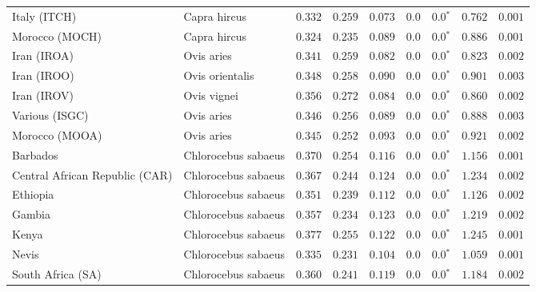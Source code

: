 \begin{center}
\begin{adjustbox}{width = 1\textwidth}
\begin{tabular}{|l|l|r|r|r|r|r|r|r|}
            Italy (ITCH)                    & Capra hircus          & $ 0.332$ & $ 0.259$ & $ 0.073$ & $0.0$ & $\bm{0.0{^*}}$ & $ 0.762$ & $ 0.001$  \\
            Morocco (MOCH)                    & Capra hircus     & $ 0.324$ & $ 0.235$ & $ 0.089$ & $0.0$ & $\bm{0.0{^*}}$ & $ 0.886$ & $ 0.001$ \\
            Iran (IROA)                    & Ovis aries         & $ 0.341$ & $ 0.259$ & $ 0.082$ & $0.0$ & $\bm{0.0{^*}}$ & $ 0.823$ & $ 0.002$ \\
            Iran (IROO)                 & Ovis orientalis          & $ 0.348$ & $ 0.258$ & $ 0.090$ & $0.0$ & $\bm{0.0{^*}}$ & $ 0.901$ & $ 0.003$ \\
            Iran (IROV)                 & Ovis vignei          & $ 0.356$ & $ 0.272$ & $ 0.084$ & $0.0$ & $\bm{0.0{^*}}$ & $ 0.860$ & $ 0.002$ \\
            Various (ISGC)                       & Ovis aries & $ 0.346$ & $ 0.256$ & $ 0.089$ & $0.0$ & $\bm{0.0{^*}}$ & $ 0.888$ & $ 0.003$ \\
            Morocco (MOOA) & Ovis aries & $ 0.345$ & $ 0.252$ & $ 0.093$ & $0.0$ & $\bm{0.0{^*}}$ & $ 0.921$ & $ 0.002$ \\
            Barbados                       & Chlorocebus sabaeus & $ 0.370$ & $ 0.254$ & $ 0.116$ & $0.0$ & $\bm{0.0{^*}}$ & $ 1.156$ & $ 0.001$ \\
            Central African Republic (CAR)                         & Chlorocebus sabaeus & $ 0.367$ & $ 0.244$ & $ 0.124$ & $0.0$ & $\bm{0.0{^*}}$ & $ 1.234$ & $ 0.002$ \\
            Ethiopia                          & Chlorocebus sabaeus & $ 0.351$ & $ 0.239$ & $ 0.112$ & $0.0$ & $\bm{0.0{^*}}$ & $ 1.126$ & $ 0.002$ \\
            Gambia                          & Chlorocebus sabaeus & $ 0.357$ & $ 0.234$ & $ 0.123$ & $0.0$ & $\bm{0.0{^*}}$ & $ 1.219$ & $ 0.002$ \\
            Kenya              & Chlorocebus sabaeus & $ 0.377$ & $ 0.255$ & $ 0.122$ & $0.0$ & $\bm{0.0{^*}}$ & $ 1.245$ & $ 0.001$ \\
            Nevis               & Chlorocebus sabaeus & $ 0.335$ & $ 0.231$ & $ 0.104$ & $0.0$ & $\bm{0.0{^*}}$ & $ 1.059$ & $ 0.001$ \\
            South Africa (SA)                         & Chlorocebus sabaeus & $ 0.360$ & $ 0.241$ & $ 0.119$ & $0.0$ & $\bm{0.0{^*}}$ & $ 1.184$ & $ 0.002$ \\

\end{tabular}
\end{adjustbox}
\end{center}
